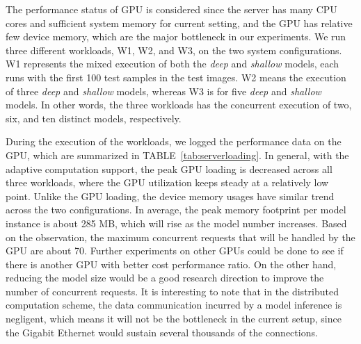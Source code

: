 \documentclass[conference]{IEEEtran}
\def\tablename{TABLE}
\begin{document}
The performance status of GPU is considered since the server has many CPU cores and sufficient system memory for current setting, and the GPU has relative few device memory, which are the major bottleneck in our experiments. We run three different workloads, W1, W2, and W3, on the two system configurations. W1 represents the mixed execution of both the \emph{deep} and \emph{shallow} models, each runs with the first 100 test samples in the test images. W2 means the execution of three \emph{deep} and \emph{shallow} models, whereas W3 is for five \emph{deep} and \emph{shallow} models. In other words, the three workloads has the concurrent execution of two, six, and ten distinct models, respectively.

During the execution of the workloads, we logged the performance data on the GPU, which are summarized in \tablename~\ref{tab:serverloading}. In general, with the adaptive computation support, the peak GPU loading is decreased across all three workloads, where the GPU utilization keeps steady at a relatively low point. Unlike the GPU loading, the device memory usages have similar trend across the two configurations. In average, the peak memory footprint per model instance is about 285 MB, which will rise as the model number increases. Based on the observation, the maximum concurrent requests that will be handled by the GPU are about 70. Further experiments on other GPUs could be done to see if there is another GPU with better cost performance ratio. On the other hand, reducing the model size would be a good research direction to improve the number of concurrent requests.
It is interesting to note that in the distributed computation scheme, the data communication incurred by a model inference is negligent, which means it will not be the bottleneck in the current setup, since the Gigabit Ethernet would sustain several thousands of the connections.
\end{document}
